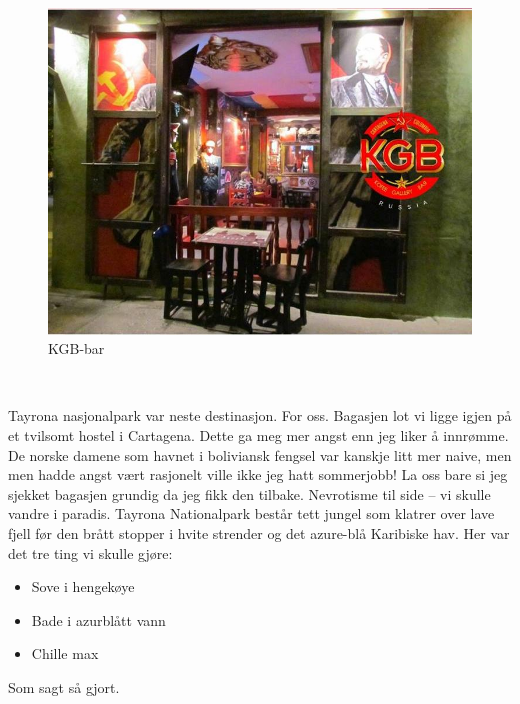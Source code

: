 \begin{figure}[!h]
	\centering
	\includegraphics[width=\textwidth]{kgbbar}
	\caption*{KGB-bar}
	\label{fig:kgbbar}
\end{figure}\\
\clearpage

Tayrona nasjonalpark var neste destinasjon. For oss. Bagasjen lot vi
ligge igjen på et tvilsomt hostel i Cartagena. Dette ga meg mer angst
enn jeg liker å innrømme. De norske damene som havnet i boliviansk
fengsel var kanskje litt
mer naive, men men hadde angst vært rasjonelt ville ikke jeg
hatt sommerjobb! La oss bare si jeg sjekket bagasjen
grundig da jeg fikk den tilbake. Nevrotisme til side -- vi
skulle vandre i paradis. Tayrona Nationalpark består tett jungel som
klatrer over lave fjell før den brått stopper i hvite strender og det
azure-blå Karibiske hav. Her var det tre ting vi skulle gjøre:

\begin{itemize}
	\item Sove i hengekøye
	\item Bade i azurblått vann
	\item Chille max
\end{itemize}

Som sagt så gjort.

